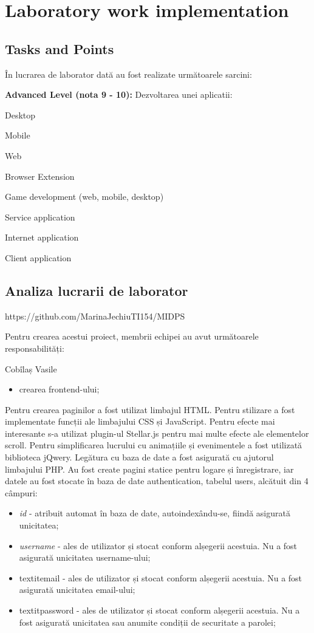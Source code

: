 \section{Laboratory work implementation}

\subsection{Tasks and Points}

În lucrarea de laborator dată au fost realizate următoarele sarcini:
\begin{enumerate}
\textbf{Advanced Level (nota 9 - 10):}
Dezvoltarea unei aplicatii:

Desktop

Mobile

Web

Browser Extension

Game development (web, mobile, desktop)

Service application

Internet application

Client application



\subsection{Analiza lucrarii de laborator}

https://github.com/MarinaJechiuTI154/MIDPS
	
	Pentru crearea acestui proiect, membrii echipei au avut următoarele responsabilități:

	Cobîlaș Vasile
	\begin{itemize}
	\item crearea frontend-ului;
	\end{itemize}
	
	Pentru crearea paginilor a fost utilizat limbajul HTML. Pentru stilizare a fost implementate funcții ale limbajului CSS și JavaScript. Pentru efecte mai interesante s-a utilizat plugin-ul Stellar.js pentru mai multe efecte ale elementelor scroll. Pentru simplificarea lucrului cu animațiile și evenimentele a fost utilizată biblioteca jQwery.
	Legătura cu baza de date a fost asigurată cu ajutorul limbajului PHP. Au fost create pagini statice pentru logare și înregistrare, iar datele au fost stocate în baza de date authentication, tabelul users, alcătuit din 4 câmpuri:
	\begin{itemize}
	\item \textit{id} - atribuit automat în baza de date, autoindexându-se, fiindă asigurată unicitatea;
	\item \textit{username} - ales de utilizator și stocat conform alșegerii acestuia. Nu a fost asigurată unicitatea username-ului;
	\item textit{email} - ales de utilizator și stocat conform alșegerii acestuia. Nu a fost asigurată unicitatea email-ului;
	\item textit{password} - ales de utilizator și stocat conform alșegerii acestuia. Nu a fost asigurată unicitatea sau anumite condiții de securitate a parolei;
	\end{itemize}


\end{enumerate}
